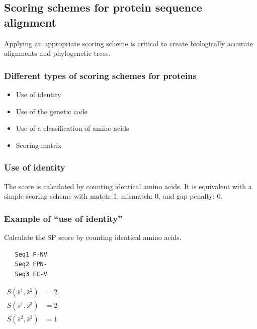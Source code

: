 %
%

%
%
\subsection{Scoring schemes for protein sequence alignment}
Applying an appropriate scoring scheme is critical to create biologically accurate alignments and phylogenetic trees. 

%
%
\subsubsection*{Different types of scoring schemes for proteins}
\begin{itemize}
\item Use of identity
\item Use of the genetic code
\item Use of a classification of amino acids
\item Scoring matrix
\end{itemize}

%
%
\subsubsection*{Use of identity}
The score is calculated by counting identical amino acids. It is equivalent with a simple scoring scheme with match: 1, mismatch: 0, and gap penalty: 0.

%
%
\subsubsection*{Example of ``use of identity''}
Calculate the SP score by counting identical amino acids. 

\begin{verbatim}
   Seq1 F-NV
   Seq2 FPN-
   Seq3 FC-V
\end{verbatim}

$\begin{aligned}
S(\bar{s}^1, \bar{s}^2) &= 2 \\
S(\bar{s}^1, \bar{s}^3) &= 2 \\
S(\bar{s}^2, \bar{s}^3) &= 1
\end{aligned} $

